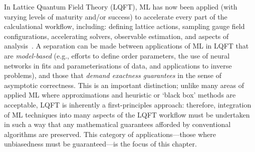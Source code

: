 \documentclass[12pt]{article}
\begin{document}
In Lattice Quantum Field Theory (LQFT), ML has now been applied (with varying levels of maturity and/or success) to accelerate every part of the calculational workflow, including: defining lattice actions, sampling gauge field configurations, accelerating solvers, observable estimation, and aspects of analysis~\cite{Boyda:2022nmh}. 
A separation can be made between applications of ML in LQFT that are {\it model-based} (e.g., efforts to define order parameters, the use of neural networks in fits and parameterisations of data, and applications to inverse problems), and those that {\it demand exactness guarantees} in the sense of asymptotic correctness. This is an important distinction; unlike many areas of applied ML where approximations and heuristic or `black box' methods are acceptable, LQFT is inherently a first-principles approach: therefore, integration of ML techniques into many aspects of the LQFT workflow must be undertaken in such a way that any mathematical guarantees afforded by conventional algorithms are preserved. 
This category of applications---those where unbiasedness must be guaranteed---is the focus of this chapter.
\end{document}
